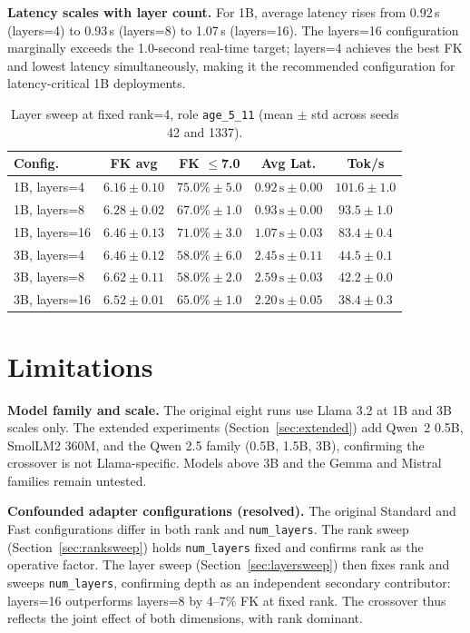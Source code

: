 \documentclass[journal]{IEEEtai}
\begin{document}
\textbf{Latency scales with layer count.} For 1B, average latency rises from 0.92\,s (layers=4) to 0.93\,s (layers=8) to 1.07\,s (layers=16). The layers=16 configuration marginally exceeds the 1.0-second real-time target; layers=4 achieves the best FK and lowest latency simultaneously, making it the recommended configuration for latency-critical 1B deployments.

\begin{table}[!t]
  \centering
  \caption{Layer sweep at fixed rank=4, role \texttt{age\_5\_11} (mean $\pm$ std across seeds 42 and 1337).}
  \label{tab:layersweep}
  \small
  \begin{tabular}{lcccc}
    \hline
    Config. & FK avg & FK $\leq$7.0 & Avg Lat. & Tok/s \\
    \hline
    1B, layers=4  & $6.16 \pm 0.10$ & $75.0\% \pm 5.0$ & $0.92\,\text{s} \pm 0.00$ & $101.6 \pm 1.0$ \\
    1B, layers=8  & $6.28 \pm 0.02$ & $67.0\% \pm 1.0$ & $0.93\,\text{s} \pm 0.00$ & $93.5 \pm 1.0$  \\
    1B, layers=16 & $6.46 \pm 0.13$ & $71.0\% \pm 3.0$ & $1.07\,\text{s} \pm 0.03$ & $83.4 \pm 0.4$  \\
    3B, layers=4  & $6.46 \pm 0.12$ & $58.0\% \pm 6.0$ & $2.45\,\text{s} \pm 0.11$ & $44.5 \pm 0.1$  \\
    3B, layers=8  & $6.62 \pm 0.11$ & $58.0\% \pm 2.0$ & $2.59\,\text{s} \pm 0.03$ & $42.2 \pm 0.0$  \\
    3B, layers=16 & $6.52 \pm 0.01$ & $65.0\% \pm 1.0$ & $2.20\,\text{s} \pm 0.05$ & $38.4 \pm 0.3$  \\
    \hline
  \end{tabular}
\end{table}

\section{Limitations}\label{sec:limitations}

\textbf{Model family and scale.} The original eight runs use Llama 3.2 at 1B and 3B scales only. The extended experiments (Section~\ref{sec:extended}) add Qwen~2 0.5B, SmolLM2 360M, and the Qwen 2.5 family (0.5B, 1.5B, 3B), confirming the crossover is not Llama-specific. Models above 3B and the Gemma and Mistral families remain untested.

\textbf{Confounded adapter configurations (resolved).} The original Standard and Fast configurations differ in both rank and \texttt{num\_layers}. The rank sweep (Section~\ref{sec:ranksweep}) holds \texttt{num\_layers} fixed and confirms rank as the operative factor. The layer sweep (Section~\ref{sec:layersweep}) then fixes rank and sweeps \texttt{num\_layers}, confirming depth as an independent secondary contributor: layers=16 outperforms layers=8 by 4--7\% FK at fixed rank. The crossover thus reflects the joint effect of both dimensions, with rank dominant.
\end{document}
